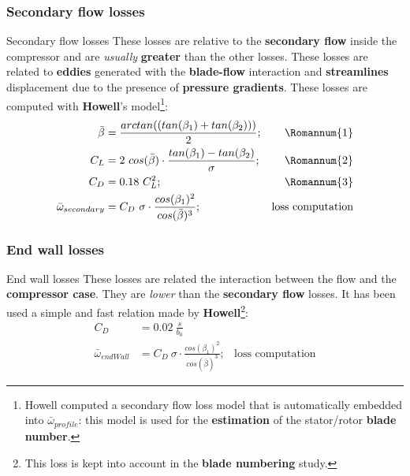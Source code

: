 \subsubsection{Secondary flow losses}
	\begin{frame}{Secondary flow losses}
		These losses are relative to the \textbf{secondary flow} inside the compressor and are \textit{usually} \textbf{greater} than the other losses. These losses are related to \textbf{eddies} generated with the \textbf{blade-flow} interaction and \textbf{streamlines} displacement due to the presence of \textbf{pressure gradients}. 
		\newline 
		These losses are computed with \textbf{Howell}'s model\footnote{Howell computed a secondary flow loss model that is automatically embedded into $\bar{\omega}_{profile}$: this model is used for the \textbf{estimation} of the stator/rotor \textbf{blade number}.}:
		\begin{align}
			\bar{\beta} & = \frac{arctan( ( tan( \beta_1 ) + tan( \beta_2 ) ) )}{2}; & \text{\Romannum{1}} \nonumber \\ 
			C_{L} & = 2 \ cos( \bar{\beta} ) \cdot \frac{tan( \beta_1 ) - tan( \beta_2 )}{\sigma}; & \text{\Romannum{2}} \nonumber \\
			C_{D} & = 0.18 \ C_{L}^2; & \text{\Romannum{3}} \nonumber \\
			\bar{\omega}_{secondary} & = C_{D} \ \sigma \cdot \frac{cos( \beta_1 )^2}{cos( \bar{\beta} )^3}; & \text{loss computation} \nonumber 
		\end{align}
	\end{frame}
\subsubsection{End wall losses}
	\begin{frame}{End wall losses}
		These losses are related the interaction between the flow and the \textbf{compressor case}. They are \textit{lower} than the \textbf{secondary flow} losses.
		\newline
		It has been used a simple and fast relation made by \textbf{Howell}\footnote{This loss is kept into account in the \textbf{blade numbering} study.}:
		\begin{align}
			C_{D} & = 0.02 \ \frac{s}{b_{0}} \nonumber \\ 
			\bar{\omega}_{endWall} & = C_{D} \ \sigma \cdot \frac{cos( \beta_1 )^2}{cos( \bar{\beta} )^3}; & \text{loss computation} \nonumber 
		\end{align}
		
	\end{frame}
